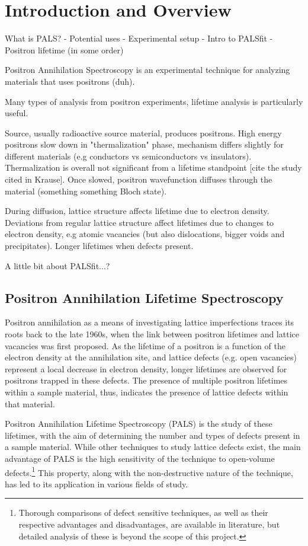\chapter*{Introduction and Overview}

What is PALS?
- Potential uses
- Experimental setup
- Intro to PALSfit
- Positron lifetime
(in some order)

Positron Annihilation Spectroscopy is an experimental technique for analyzing materials that uses positrons (duh).

Many types of analysis from positron experiments, lifetime analysis is particularly useful.

Source, usually radioactive source material, produces positrons. High energy positrons slow down in "thermalization" phase, mechanism differs slightly for different materials (e.g conductors vs semiconductors vs insulators). Thermalization is overall not significant from a lifetime standpoint [cite the study cited in Krause]. Once slowed, positron wavefunction diffuses through the material (something something Bloch state).

During diffusion, lattice structure affects lifetime due to electron density. Deviations from regular lattice structure affect lifetimes due to changes to electron density, e.g atomic vacancies (but also dislocations, bigger voids and precipitates). Longer lifetimes when defects present.

A little bit about PALSfit...?

\pagebreak

\section{Positron Annihilation Lifetime Spectroscopy}

Positron annihilation as a means of investigating lattice imperfections traces its roots back to the late 1960s, when the link between positron lifetimes and lattice vacancies was first proposed. \cite{Mackenzie67} As the lifetime of a positron is a function of the electron density at the annihilation site, and lattice defects (e.g. open vacancies) represent a local decrease in electron density, longer lifetimes are observed for positrons trapped in these defects. \cite{Krause} The presence of multiple positron lifetimes within a sample material, thus, indicates the presence of lattice defects within that material.

Positron Annihilation Lifetime Spectroscopy (PALS) is the study of these lifetimes, with the aim of determining the number and types of defects present in a sample material. While other techniques to study lattice defects exist, the main advantage of PALS is the high sensitivity of the technique to open-volume defects.\footnote{Thorough comparisons of defect sensitive techniques, as well as their respective advantages and disadvantages, are available in literature, but detailed analysis of these is beyond the scope of this project.} This property, along with the non-destructive nature of the technique, has led to its application in various fields of study.\cite{PharmApp} \cite{Nuc}


